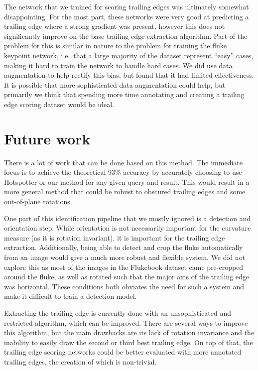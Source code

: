 The network that we trained for scoring trailing edges was ultimately somewhat disappointing.
For the most part, these networks were very good at predicting a trailing edge where a strong gradient was present, however this does not significantly improve on the base trailing edge extraction algorithm.
Part of the problem for this is similar in nature to the problem for training the fluke keypoint network, i.e.\ that a large majority of the dataset represent ``easy'' cases, making it hard to train the network to handle hard cases.
We did use data augmentation to help rectify this bias, but found that it had limited effectiveness.
It is possible that more sophisticated data augmentation could help, but primarily we think that spending more time annotating and creating a trailing edge scoring dataset would be ideal.

\section{Future work}

There is a lot of work that can be done based on this method.
The immediate focus is to achieve the theoretical 93\% accuracy by accurately choosing to use Hotspotter or our method for any given query and result.
This would result in a more general method that could be robust to obscured trailing edges and some out-of-plane rotations.

One part of this identification pipeline that we mostly ignored is a detection and orientation step.
While orientation is not necessarily important for the curvature measure (as it is rotation invariant), it is important for the trailing edge extraction.
Additionally, being able to detect and crop the fluke automatically from an image would give a much more robust and flexible system.
We did not explore this as most of the images in the Flukebook dataset came pre-cropped around the fluke, as well as rotated such that the major axis of the trailing edge was horizontal.
These conditions both obviates the need for such a system and make it difficult to train a detection model.

Extracting the trailing edge is currently done with an unsophisticated and restricted algorithm, which can be improved. 
There are several ways to improve this algorithm, but the main drawbacks are its lack of rotation invariance and the inability to easily draw the second or third best trailing edge.
On top of that, the trailing edge scoring networks could be better evaluated with more annotated trailing edges, the creation of which is non-trivial.


